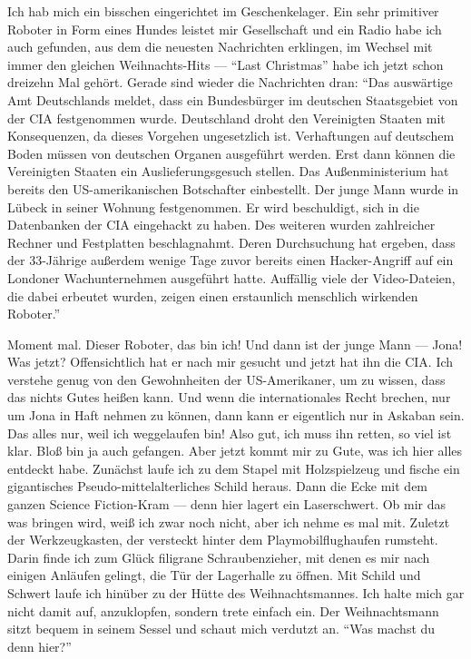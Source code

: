 Ich hab mich ein bisschen eingerichtet im Geschenkelager. Ein sehr primitiver Roboter in Form eines Hundes leistet mir Gesellschaft und ein Radio habe ich auch gefunden, aus dem die neuesten Nachrichten erklingen, im Wechsel mit immer den gleichen Weihnachts-Hits — "`Last Christmas"'  habe ich jetzt schon dreizehn Mal gehört. Gerade sind wieder die Nachrichten dran: "`Das auswärtige Amt Deutschlands meldet, dass ein Bundesbürger im deutschen Staatsgebiet von der CIA festgenommen wurde. Deutschland droht den Vereinigten Staaten mit Konsequenzen, da dieses Vorgehen ungesetzlich ist. Verhaftungen auf deutschem Boden müssen von deutschen Organen ausgeführt werden. Erst dann können die Vereinigten Staaten ein Auslieferungsgesuch stellen. Das Außenministerium hat bereits den US-amerikanischen Botschafter einbestellt. Der junge Mann wurde in Lübeck in seiner Wohnung festgenommen. Er wird beschuldigt, sich in die Datenbanken der CIA eingehackt zu haben. Des weiteren wurden zahlreicher Rechner und Festplatten beschlagnahmt. Deren Durchsuchung hat ergeben, dass der 33-Jährige außerdem wenige Tage zuvor bereits einen Hacker-Angriff auf ein Londoner Wachunternehmen ausgeführt hatte. Auffällig viele der Video-Dateien, die dabei erbeutet wurden, zeigen einen erstaunlich menschlich wirkenden Roboter."'

Moment mal. Dieser Roboter, das bin ich! Und dann ist der junge Mann — Jona! Was jetzt? Offensichtlich hat er nach mir gesucht und jetzt hat ihn die CIA. Ich verstehe genug von den Gewohnheiten der US-Amerikaner, um zu wissen, dass das nichts Gutes heißen kann. Und wenn die internationales Recht brechen, nur um Jona in Haft nehmen zu können, dann kann er eigentlich nur in Askaban sein. Das alles nur, weil ich weggelaufen bin! Also gut, ich muss ihn retten, so viel ist klar. Bloß bin ja auch gefangen. Aber jetzt kommt mir zu Gute, was ich hier alles entdeckt habe. Zunächst laufe ich zu dem Stapel mit Holzspielzeug und fische ein gigantisches Pseudo-mittelalterliches Schild heraus. Dann die Ecke mit dem ganzen Science Fiction-Kram — denn hier lagert ein Laserschwert. Ob mir das was bringen wird, weiß ich zwar noch nicht, aber ich nehme es mal mit. Zuletzt der Werkzeugkasten, der versteckt hinter dem Playmobilflughaufen rumsteht. Darin finde ich zum Glück filigrane Schraubenzieher, mit denen es mir nach einigen Anläufen gelingt, die Tür der Lagerhalle zu öffnen. Mit Schild und Schwert laufe ich hinüber zu der Hütte des Weihnachtsmannes. Ich halte mich gar nicht damit auf, anzuklopfen, sondern trete einfach ein. Der Weihnachtsmann sitzt bequem in seinem Sessel und schaut mich verdutzt an. "`Was machst du denn hier?"'

